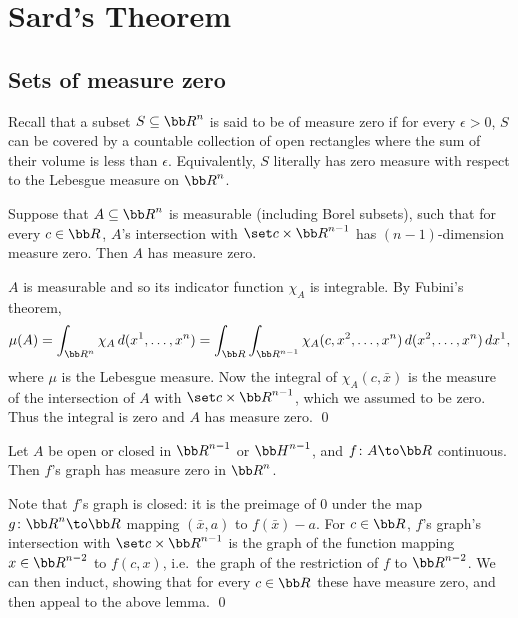 \section{Sard's Theorem}

\subsection{Sets of measure zero}

\bdefn

    Recall that a subset $S\subseteq\bR^n$ is said to be of {\emphcolor measure zero} if for every $\epsilon>0$, $S$ can be covered by
    a countable collection of open rectangles where the sum of their volume is less than $\epsilon$.
    Equivalently, $S$ literally has zero measure with respect to the Lebesgue measure on $\bR^n$.

\edefn

\blemm

    Suppose that $A\subseteq\bR^n$ is measurable (including Borel subsets), such that for every $c\in\bR$,
    $A$'s intersection with $\set c\times\bR^{n-1}$ has $(n-1)$-dimension measure zero.
    Then $A$ has measure zero.

\elemm

\bproof

    $A$ is measurable and so its indicator function $\chi_A$ is integrable.
    By Fubini's theorem,
    $$ \mu(A) = \int_{\bR^n}\chi_A\,d(x^1,\dots,x^n) = \int_\bR\int_{\bR^{n-1}}\chi_A(c,x^2,\dots,x^n)\,d(x^2,\dots,x^n)\,dx^1 , $$
    where $\mu$ is the Lebesgue measure.
    Now the integral of $\chi_A(c,\bar x)$ is the measure of the intersection of $A$ with $\set c\times\bR^{n-1}$, which we assumed to be zero.
    Thus the integral is zero and $A$ has measure zero.
    \qed

\eproof

\bprop

    Let $A$ be open or closed in $\bR^{n-1}$ or $\bH^{n-1}$, and $f\colon A\to\bR$ continuous.
    Then $f$'s graph has measure zero in $\bR^n$.

\eprop

\bproof

    Note that $f$'s graph is closed: it is the preimage of $0$ under the map $g\colon\bR^n\to\bR$ mapping $(\bar x,a)$ to $f(\bar x)-a$.
    For $c\in\bR$, $f$'s graph's intersection with $\set c\times\bR^{n-1}$ is the graph of the function mapping $x\in\bR^{n-2}$ to $f(c,x)$, i.e.\ the graph
    of the restriction of $f$ to $\bR^{n-2}$.
    We can then induct, showing that for every $c\in\bR$ these have measure zero, and then appeal to the above lemma.
    \qed

